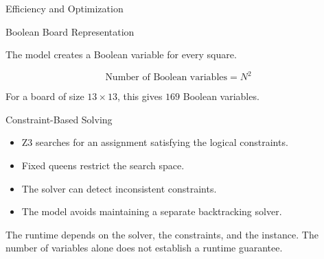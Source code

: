 \documentclass[aspectratio=169,12pt]{beamer}
\begin{document}
\begin{frame}{Efficiency and Optimization}
\vspace{-0.3cm}
\begin{block}{Boolean Board Representation}

The model creates a Boolean variable for every square.

\[
\text{Number of Boolean variables}=N^2
\]

For a board of size $13\times13$, this gives $169$
Boolean variables.
\end{block}
\vspace{-0.3cm}
\begin{block}{Constraint-Based Solving}

\begin{itemize}
    \item Z3 searches for an assignment satisfying the
          logical constraints.
    \item Fixed queens restrict the search space.
    \item The solver can detect inconsistent constraints.
    \item The model avoids maintaining a separate
          backtracking solver.
\end{itemize}

\end{block}

\small
The runtime depends on the solver, the constraints, and
the instance. The number of variables alone does not
establish a runtime guarantee.

\end{frame}

\end{document}
